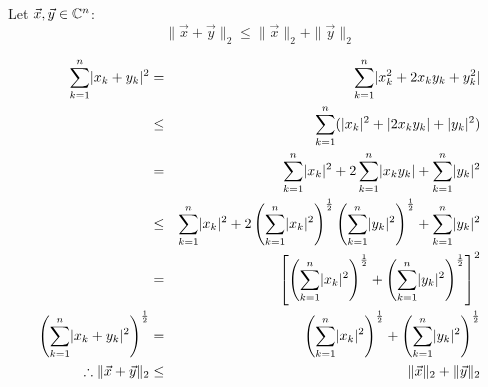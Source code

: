 \documentclass[letterpaper,12pt,fleqn]{article}
\newcommand{\norm}[1]{\|#1\|}
\newcommand{\vx}{\vec{x}}
\newcommand{\vy}{\vec{y}}
\begin{document}
\begin{theorem}
  Let $\vx,\vy\in\C^n$:
  \[\norm{\vx+\vy}_2\le\norm{\vx}_2+\norm{\vy}_2\]
\end{theorem}

\begin{theproof}
  \listbreak
  \begin{eqnarray*}
    \sum_{k=1}^n\abs{x_k+y_k}^2 &=& \sum_{k=1}^n\abs{x_k^2+2x_ky_k+y_k^2} \\
    &\le& \sum_{k=1}^n(\abs{x_k}^2+\abs{2x_ky_k}+\abs{y_k}^2) \\
    &=& \sum_{k=1}^n\abs{x_k}^2+2\sum_{k=1}^n\abs{x_ky_k}+
    \sum_{k=1}^n\abs{y_k}^2 \\
    &\le& \sum_{k=1}^n\abs{x_k}^2+
    2\left(\sum_{k=1}^n\abs{x_k}^2\right)^{\frac{1}{2}}
    \left(\sum_{k=1}^n\abs{y_k}^2\right)^{\frac{1}{2}}+
    \sum_{k=1}^n\abs{y_k}^2 \\
    &=&\left[\left(\sum_{k=1}^n\abs{x_k}^2\right)^{\frac{1}{2}}+
      \left(\sum_{k=1}^n\abs{y_k}^2\right)^{\frac{1}{2}}\right]^2 \\
    \left(\sum_{k=1}^n\abs{x_k+y_k}^2\right)^{\frac{1}{2}} &=&
    \left(\sum_{k=1}^n\abs{x_k}^2\right)^{\frac{1}{2}}+
    \left(\sum_{k=1}^n\abs{y_k}^2\right)^{\frac{1}{2}} \\
    \therefore \norm{\vx+\vy}_2 &\le& \norm{\vx}_2+\norm{\vy}_2
  \end{eqnarray*}
\end{theproof}
\end{document}
